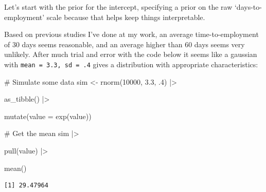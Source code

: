 \documentclass[
  letterpaper,
  DIV=11,
  numbers=noendperiod]{scrreprt}
\newenvironment{Shaded}{\begin{snugshade}}{\end{snugshade}}
\newcommand{\AttributeTok}[1]{\textcolor[rgb]{0.40,0.45,0.13}{#1}}
\newcommand{\CommentTok}[1]{\textcolor[rgb]{0.37,0.37,0.37}{#1}}
\newcommand{\DecValTok}[1]{\textcolor[rgb]{0.68,0.00,0.00}{#1}}
\newcommand{\FloatTok}[1]{\textcolor[rgb]{0.68,0.00,0.00}{#1}}
\newcommand{\FunctionTok}[1]{\textcolor[rgb]{0.28,0.35,0.67}{#1}}
\newcommand{\NormalTok}[1]{\textcolor[rgb]{0.00,0.23,0.31}{#1}}
\newcommand{\OtherTok}[1]{\textcolor[rgb]{0.00,0.23,0.31}{#1}}
\newcommand{\SpecialCharTok}[1]{\textcolor[rgb]{0.37,0.37,0.37}{#1}}
\begin{document}
Let's start with the prior for the intercept, specifying a prior on the
raw `days-to-employment' scale because that helps keep things
interpretable.

Based on previous studies I've done at my work, an average
time-to-employment of 30 days seems reasonable, and an average higher
than 60 days seems very unlikely. After much trial and error with the
code below it seems like a gaussian with
\texttt{mean\ =\ 3.3,\ sd\ =\ .4} gives a distribution with appropriate
characteristics:

\begin{Shaded}
\begin{Highlighting}[]
\CommentTok{\# Simulate some data}
\NormalTok{sim }\OtherTok{\textless{}{-}} \FunctionTok{rnorm}\NormalTok{(}\DecValTok{10000}\NormalTok{, }\FloatTok{3.3}\NormalTok{, .}\DecValTok{4}\NormalTok{) }\SpecialCharTok{|\textgreater{}}

  \FunctionTok{as\_tibble}\NormalTok{() }\SpecialCharTok{|\textgreater{}}

  \FunctionTok{mutate}\NormalTok{(}\AttributeTok{value =} \FunctionTok{exp}\NormalTok{(value)) }

\CommentTok{\# Get the mean}
\NormalTok{sim }\SpecialCharTok{|\textgreater{}} 

    \FunctionTok{pull}\NormalTok{(value) }\SpecialCharTok{|\textgreater{}}
    
    \FunctionTok{mean}\NormalTok{()}
\end{Highlighting}
\end{Shaded}

\begin{verbatim}
[1] 29.47964
\end{verbatim}
\end{document}
